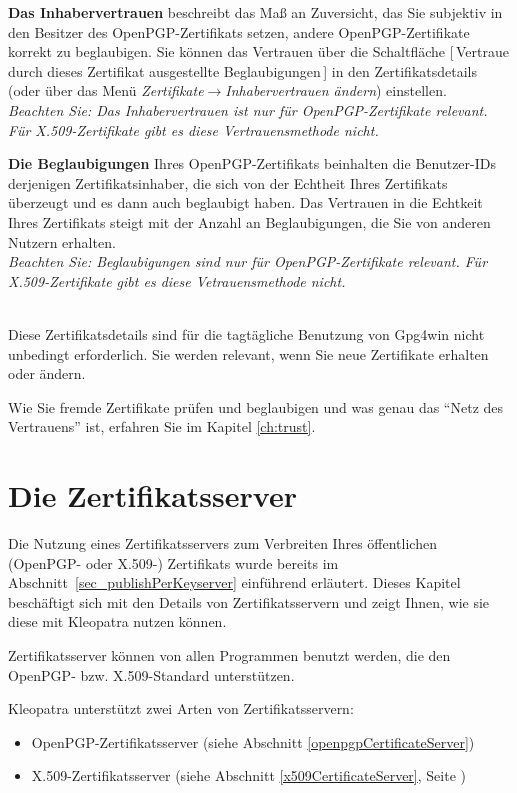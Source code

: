 \documentclass[a4paper,11pt, oneside,openright,titlepage,dvips]{scrbook}
\newcommand{\Button}[1]{[\,#1\,]}
\newcommand{\Menu}[1]{\emph{#1}}
\newcounter{chapter}
\begin{document}
\textbf{Das Inhabervertrauen} beschreibt das Maß an Zuversicht, das
Sie subjektiv in den Besitzer des OpenPGP-Zertifikats setzen, andere
OpenPGP-Zertifikate korrekt zu beglaubigen.
Sie können das Vertrauen über die Schaltfläche \Button{Vertraue durch dieses Zertifikat
ausgestellte Beglaubigungen} in den Zertifikatsdetails (oder über das Menü
\Menu{Zertifikate$\rightarrow$Inhabervertrauen ändern}) einstellen.\\
\textit{Beachten Sie: Das Inhabervertrauen ist nur für OpenPGP-Zertifikate
relevant. Für X.509-Zertifikate gibt es diese Vertrauensmethode
nicht.}

\textbf{Die Beglaubigungen} Ihres OpenPGP-Zertifikats beinhalten die
Benutzer-IDs derjenigen Zertifikatsinhaber, die sich von der Echtheit
Ihres Zertifikats überzeugt und es dann auch beglaubigt haben. Das
Vertrauen in die Echtkeit Ihres Zertifikats steigt mit der Anzahl an
Beglaubigungen, die Sie von anderen Nutzern erhalten.\\
\textit{Beachten Sie: Beglaubigungen sind nur für OpenPGP-Zertifikate
relevant. Für X.509-Zertifikate gibt es diese Vetrauensmethode nicht.}

~\\
Diese Zertifikatsdetails sind für die tagtägliche Benutzung von Gpg4win nicht
unbedingt erforderlich. Sie werden relevant, wenn Sie neue Zertifikate
erhalten oder ändern. 

Wie Sie fremde Zertifikate prüfen und beglaubigen und was genau das
"`Netz des Vertrauens"' ist, erfahren Sie im Kapitel \ref{ch:trust}.


\clearpage
\chapter{Die Zertifikatsserver}
\label{ch:keyserver}


Die Nutzung eines Zertifikatsservers zum Verbreiten Ihres
öffentlichen (OpenPGP- oder X.509-) Zertifikats wurde bereits im
Abschnitt~\ref{sec_publishPerKeyserver} einführend erläutert. Dieses
Kapitel beschäftigt sich mit den Details von Zertifikatsservern und
zeigt Ihnen, wie sie diese mit Kleopatra nutzen können.

Zertifikatsserver können von allen Programmen benutzt werden, die den
OpenPGP- bzw. X.509-Standard unterstützen.

Kleopatra unterstützt zwei Arten von Zertifikatsservern:
\begin{itemize}
    \item OpenPGP-Zertifikatsserver (siehe Abschnitt \ref{openpgpCertificateServer})
    \item X.509-Zertifikatsserver (siehe Abschnitt
        \ref{x509CertificateServer}, Seite \pageref{x509CertificateServer})

\end{itemize}
\end{document}
